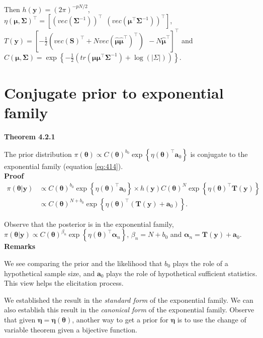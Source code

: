 \begin{enumerate}
Then $h(\mathbf{y})=(2\pi)^{-pN/2}$, $\eta(\mathbf{\mu},\mathbf{\Sigma})^{\top}=\left[\left(vec\left(\mathbf{\Sigma}^{-1}\right)\right)^{\top} \ \ \left(vec\left(\mathbf{\mu}^{\top}\mathbf{\Sigma}^{-1}\right)\right)^{\top}\right]$, $T(\mathbf{y})=\left[-\frac{1}{2}\left(vec\left(\mathbf{S}\right)^{\top}+N vec\left(\hat{\mathbf{\mu}}\hat{\mathbf{\mu}}^{\top}\right)^{\top}\right) \ \ -N\hat{\mathbf{\mu}}^{\top}\right]^{\top}$ and $C(\mathbf{\mu},\mathbf{\Sigma})=\exp\left\{-\frac{1}{2}\left(tr\left(\mathbf{\mu}\mathbf{\mu}^{\top}\mathbf{\Sigma}^{-1}\right)+\log(|\Sigma|)\right)\right\}$.
\end{enumerate}

\section{Conjugate prior to exponential family}\label{sec42}

\textbf{Theorem 4.2.1}

The prior distribution $\pi(\mathbf{\theta})\propto C(\mathbf{\theta})^{b_0}\exp\left\{\eta(\mathbf{\theta})^{\top}\mathbf{a}_0\right\}$ is conjugate to the exponential family (equation \ref{eq:414}).\\

\textbf{Proof}
\begin{align}
	\pi(\mathbf{\theta}|\mathbf{y})& \propto C(\mathbf{\theta})^{b_0}\exp\left\{\eta(\mathbf{\theta})^{\top}\mathbf{a}_0\right\} \times h(\mathbf{y}) C(\mathbf{\theta})^N\exp\left\{\eta(\mathbf{\theta})^{\top}\mathbf{T}(\mathbf{y})\right\}\nonumber\\
	& \propto C(\mathbf{\theta})^{N+b_0} \exp\left\{\eta(\mathbf{\theta})^{\top}(\mathbf{T}(\mathbf{y})+\mathbf{a}_0)\right\}.\nonumber 
\end{align}

Observe that the posterior is in the exponential family, $\pi(\mathbf{\theta}|\mathbf{y})\propto C(\mathbf{\theta})^{\beta_n} \exp\left\{\eta(\mathbf{\theta})^{\top}\mathbf{\alpha}_n\right\}$, $\beta_n=N+b_0$ and $\mathbf{\alpha}_n=\mathbf{T}(\mathbf{y})+\mathbf{a}_0$.\\

\textbf{Remarks}

We see comparing the prior and the likelihood that $b_0$ plays the role of a hypothetical sample size, and $\mathbf{a}_0$ plays the role of hypothetical sufficient statistics. This view helps the elicitation process.

We established the result in the \textit{standard form} of the exponential family. We can also establish this result in the \textit{canonical form} of the exponential family. Observe that given $\mathbf{\eta}=\mathbf{\eta}(\mathbf{\theta})$, another way to get a prior for $\mathbf{\eta}$ is to use the change of variable theorem given a bijective function.


